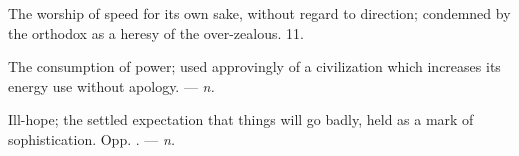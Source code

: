  The worship of speed for its own sake, without regard to direction; condemned by the orthodox as a heresy of the over-zealous.   11.

 The consumption of power; used approvingly of a civilization which increases its energy use without apology. ---  \textit{n.}

 Ill-hope; the settled expectation that things will go badly, held as a mark of sophistication. Opp. . ---  \textit{n.}
